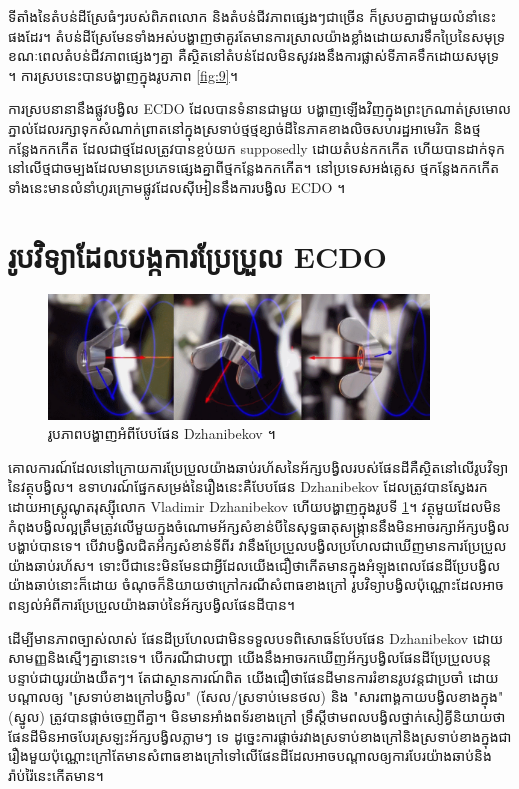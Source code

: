 \documentclass[10pt,twocolumn,letterpaper]{article}
\begin{document}
ទីតាំងនៃតំបន់ដីស្រែធំៗរបស់ពិភពលោក និងតំបន់ជីវភាពផ្សេងៗជាច្រើន ក៏ស្របគ្នាជាមួយលំនាំនេះផងដែរ។ តំបន់ដីស្រែមែនទាំងអស់បង្ហាញថាគួរតែមានការស្រាលយ៉ាងខ្លាំងដោយសារទឹកប្រៃនៃសមុទ្រ ខណៈពេលតំបន់ជីវភាពផ្សេងៗគ្នា គឺស្ថិតនៅតំបន់ដែលមិនសូវរងនឹងការផ្លាស់ទីភាគទឹកដោយសមុទ្រ \cite{28}។ ការស្របនេះបានបង្ហាញក្នុងរូបភាព \ref{fig:9}។

ការស្របនានានឹងផ្លូវបង្វិល ECDO ដែលបានទំនានជាមួយ បង្ហាញឡើងវិញក្នុងព្រះក្រណាត់ស្រមោលភ្នាល់ដែលរក្សាទុកសំណាក់ព្រាតនៅក្នុងស្រទាប់ថ្មថ្មខ្សាច់ដីនៃភាគខាងលិចសហរដ្ឋអាមេរិក \cite{21} និងថ្មកន្លែងកកកើត ដែលជាថ្មដែលត្រូវបានខ្ចប់យក supposedly ដោយតំបន់កកកើត ហើយបានដាក់ទុកនៅលើថ្មជាចម្បងដែលមានប្រភេទផ្សេងគ្នាពីថ្មកន្លែងកកកើត។ នៅប្រទេសអង់គ្លេស ថ្មកន្លែងកកកើតទាំងនេះមានលំនាំហូរក្រោមផ្លូវដែលស៊ីអៀននឹងការបង្វិល ECDO \cite{67,68}។

\section{រូបវិទ្យាដែលបង្កការប្រែប្រួល ECDO}
\begin{figure}
\begin{center}
\includegraphics[width=0.9\textwidth]{dzhani.jpg}
\end{center}
   \caption{រូបភាពបង្ហាញអំពីបែបផែន Dzhanibekov \cite{28}។}
\label{fig:10}
\end{figure}

គោលការណ៍ដែលនៅក្រោយការប្រែប្រួលយ៉ាងឆាប់រហ័សនៃអ័ក្សបង្វិលរបស់ផែនដីគឺស្ថិតនៅលើរូបវិទ្យានៃវត្ថុបង្វិល។ ឧទាហរណ៍ផ្នែកសម្រង់នៃរឿងនេះគឺបែបផែន Dzhanibekov ដែលត្រូវបានស្វែងរកដោយអាស្ត្រូណូតរុស្ស៊ីលោក Vladimir Dzhanibekov \cite{37} ហើយបង្ហាញក្នុងរូបទី \ref{fig:10}។ វត្ថុមួយដែលមិនកំពុងបង្វិលល្អត្រឹមត្រូវលើមួយក្នុងចំណោមអ័ក្សសំខាន់បីនៃសុទ្ធធាតុសង្រ្កាននឹងមិនអាចរក្សាអ័ក្សបង្វិលបង្ហាប់បានទេ។ បើវាបង្វិលជិតអ័ក្សសំខាន់ទីពីរ វានឹងប្រែប្រួលបង្វិលប្រហែលជាឃើញមានការប្រែប្រួលយ៉ាងឆាប់រហ័ស។ ទោះបីជានេះមិនមែនជាអ្វីដែលយើងជឿថាកើតមានក្នុងអំឡុងពេលផែនដីប្រែបង្វិលយ៉ាងឆាប់នោះក៏ដោយ ចំណុចក៏និយាយថាក្រៅករណីសំពាធខាងក្រៅ រូបវិទ្យាបង្វិលប៉ុណ្ណោះដែលអាចពន្យល់អំពីការប្រែប្រួលយ៉ាងឆាប់នៃអ័ក្សបង្វិលផែនដីបាន។

ដើម្បីមានភាពច្បាស់លាស់ ផែនដីប្រហែលជាមិនទទួលបទពិសោធន៍បែបផែន Dzhanibekov ដោយសាមញ្ញនិងស្មើៗគ្នានោះទេ។ បើករណីជាបញ្ហា យើងនឹងអាចរកឃើញអ័ក្សបង្វិលផែនដីប្រែប្រួលបន្តបន្ទាប់ជាយូរយ៉ាងយឺតៗ។ តែជាស្ថានការណ៍ពិត យើងជឿថាផែនដីមានការរំខានរូបវន្តជាប្រចាំ ដោយបណ្តាលឲ្យ "ស្រទាប់ខាងក្រៅបង្វិល" (សែល/ស្រទាប់មេនថល) និង "សារពាង្គកាយបង្វិលខាងក្នុង" (ស្នូល) ត្រូវបានផ្តាច់ចេញពីគ្នា។ មិនមានអាំងពទ័រខាងក្រៅ ទ្រឹស្តីថាមពលបង្វិលថ្នាក់សៀគ្វីនិយាយថា ផែនដីមិនអាចបែរស្រឡះអ័ក្សបង្វិលភ្លាមៗ ទេ ដូច្នេះការផ្តាច់រវាងស្រទាប់ខាងក្រៅនិងស្រទាប់ខាងក្នុងជារឿងមួយប៉ុណ្ណោះក្រៅតែមានសំពាធខាងក្រៅទៅលើផែនដីដែលអាចបណ្តាលឲ្យការបែរយ៉ាងឆាប់និងរ៉ាប់រ៉ៃនេះកើតមាន។
\end{document}

